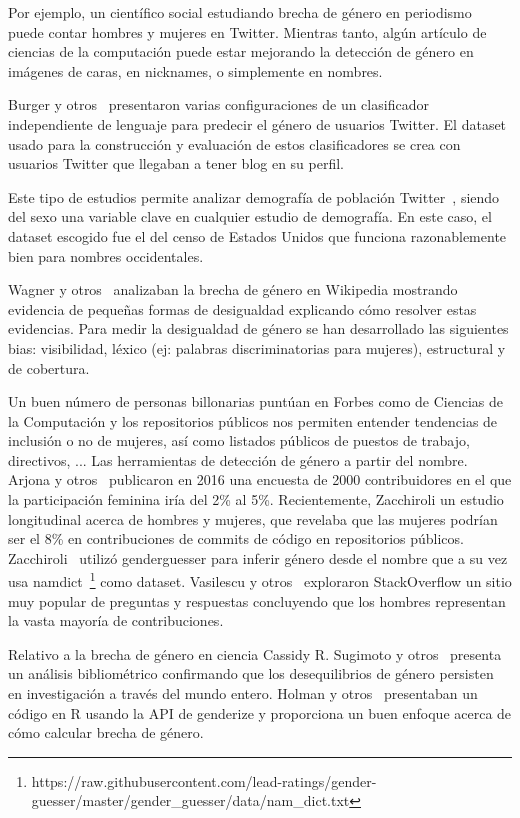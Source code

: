 \documentclass[a4paper]{article}
\begin{document}
Por ejemplo, un científico social estudiando brecha de género en
periodismo puede contar hombres y mujeres en Twitter. Mientras tanto,
algún artículo de ciencias de la computación puede estar mejorando la
detección de género en imágenes de caras, en nicknames, o simplemente
en nombres.

Burger y otros~\cite{burger2011discriminating} presentaron varias
configuraciones de un clasificador independiente de lenguaje para
predecir el género de usuarios Twitter. El dataset usado para la
construcción y evaluación de estos clasificadores se crea con usuarios
Twitter que llegaban a tener blog en su perfil.

Este tipo de estudios permite analizar demografía de población
Twitter~\cite{mislove2011understanding}, siendo del sexo una variable
clave en cualquier estudio de demografía. En este caso, el dataset
escogido fue el del censo de Estados Unidos que funciona razonablemente
bien para nombres occidentales.

Wagner y otros~\cite{wagner2015} analizaban la brecha de género en
Wikipedia mostrando evidencia de pequeñas formas de desigualdad
explicando cómo resolver estas evidencias. Para medir la desigualdad
de género se han desarrollado las siguientes bias: visibilidad,
léxico (ej: palabras discriminatorias para mujeres), estructural y
de cobertura.

Un buen número de personas billonarias puntúan en Forbes como de
Ciencias de la Computación y los repositorios públicos nos permiten
entender tendencias de inclusión o no de mujeres, así como listados
públicos de puestos de trabajo, directivos, ... Las herramientas de
detección de género a partir del nombre. Arjona y
otros~\cite{10.1007/978-3-319-39225-7_13} publicaron en 2016 una
encuesta de 2000 contribuidores en el que la participación feminina
iría del 2\% al 5\%. Recientemente, Zacchiroli un estudio
longitudinal acerca de hombres y mujeres, que revelaba que las
mujeres podrían ser el 8\% en contribuciones de commits de código
en repositorios públicos. Zacchiroli~\cite{zacchiroli2020gender}
utilizó genderguesser para inferir género desde el nombre que a su
vez usa namdict~\footnote{https://raw.githubusercontent.com/lead-ratings/gender-guesser/master/gender\_guesser/data/nam\_dict.txt}
como dataset. Vasilescu y otros~\cite{vasilescu2015gender}
exploraron StackOverflow un sitio muy popular de preguntas y
respuestas concluyendo que los hombres representan la vasta
mayoría de contribuciones.

Relativo a la brecha de género en ciencia Cassidy R. Sugimoto
y otros~\cite{lariviere2013bibliometrics} presenta un análisis
bibliométrico confirmando que los desequilibrios de género
persisten en investigación a través del mundo entero. Holman
y otros~\cite{holman2018gender} presentaban un código en R
usando la API de genderize y proporciona un buen enfoque
acerca de cómo calcular brecha de género.
\end{document}
